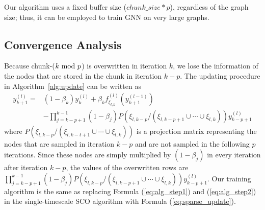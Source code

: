 Our algorithm uses a fixed buffer size ($chunk\_size* p$), regardless of the graph size; thus, it can be employed to train GNN on very large graphs. 

\subsection{Convergence Analysis} 
Because chunk-($k\ \mathrm{mod}\ p$) is overwritten in iteration $k$, we lose the information of the nodes that are stored in the chunk in iteration $k-p$. 
The updating procedure in Algorithm~\ref{alg:update} can be written as 
  \begin{equation}
    \label{eq:sparse_update}
    \begin{split}
      y^{(l)}_{k+1} = &(1-\beta_{k})y^{(l)}_k + \beta_{k}  f^{(l)}_{\xi_{l,k}}(y^{(l-1)}_{k+1})\\
               &-\prod_{j=k-p+1}^{k-1}(1-\beta_j)P(\xi_{l, {k-p}}/(\xi_{l,{k-p+1}}\cup\cdots \cup\xi_{l,k}))y^{(l)}_{k-p+1}
    \end{split}
  \end{equation}
   where $P(\xi_{l, {k-p}}/(\xi_{l,{k-t+1}}\cup\cdots \cup\xi_{l,k}))$ is a projection matrix representing the nodes that are sampled in iteration $k-p$ and are not sampled in the following $p$ iterations. 
  Since these nodes are simply multiplied by $(1-\beta_j)$ in every iteration after iteration $k-p$, the values of the overwritten rows are $\prod_{j=k-p+1}^{k-1}(1-\beta_j)P(\xi_{l, {k-p}}/(\xi_{l,{k-p+1}}\cup\cdots \cup\xi_{l,k}))y^{(l)}_{k-p+1}$. 
  Our training algorithm is the same as replacing Formula (\ref{eq:alg_step1}) and (\ref{eq:alg_step2}) in the single-timescale SCO algorithm with Formula (\ref{eq:sparse_update}). 


